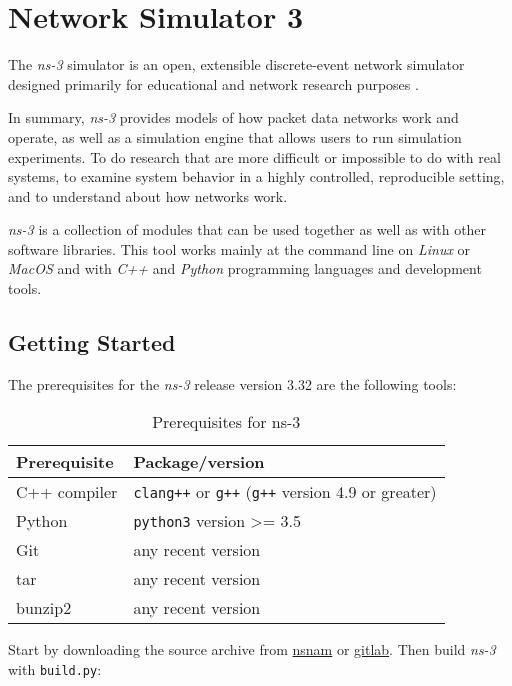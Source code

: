 \chapter{Network Simulator 3}
\label{sec:ns3}

The \textit{ns-3} simulator is an open, extensible discrete-event network simulator designed primarily 
for educational and network research purposes \cite{ns3}.

In summary, \textit{ns-3} provides models of how packet data networks work and operate, as well as a 
simulation engine that allows users to run simulation experiments. To do research that are 
more difficult or impossible to do with real systems, to examine system behavior in a highly 
controlled, reproducible setting, and to understand about how networks work.

\textit{ns-3} is a collection of modules that can be used together as well as with other software 
libraries. This tool works mainly at the command line on \textit{Linux} or \textit{MacOS} and with 
\textit{C++} and \textit{Python} programming languages and development tools.

\section{Getting Started}
\label{sec:ns3intro}

The prerequisites for the \textit{ns-3} release version 3.32 are the following tools:

\begin{table}[h]
  \centering
  \begin{tabular}{@{}ll@{}}
  \toprule
  Prerequisite & Package/version                             \\ \midrule 
  C++ compiler & \texttt{clang++} or \texttt{g++} (\texttt{g++} version 4.9 or greater) \\ 
  Python       & \texttt{python3}  version \textgreater{}= 3.5         \\ 
  Git          & any recent version                          \\ 
  tar          & any recent version                          \\ 
  bunzip2      & any recent version                          \\ \bottomrule
  \end{tabular}
  \caption{Prerequisites for ns-3}
\end{table}

Start by downloading the source archive from \href{https://www.nsnam.org/release/ns-allinone-3.32.tar.bz2}{nsnam}
or \href{https://gitlab.com/nsnam/ns-3-allinone.git}{gitlab}. Then build \textit{ns-3} with \texttt{build.py}:

